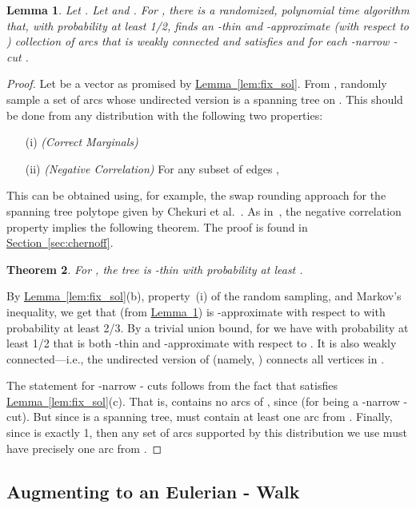 \documentclass[11pt]{article}
\newcommand{\lref}[2][]{\hyperref[#2]{#1~\ref*{#2}}}
\newtheorem{theorem}{Theorem}[section]
\newtheorem{lemma}[theorem]{Lemma}
\theoremstyle{definition}
\begin{document}
\begin{lemma} \label{lem:findtree}
  Let . Let  and .
For , there is a randomized,
  polynomial time algorithm that, with probability at least 1/2, finds
  an -thin and -approximate (with respect to )
  collection of arcs  that is weakly connected and satisfies  and  for each
  -narrow - cut .
\end{lemma}
\begin{proof}
  Let  be a vector as promised by \lref[Lemma]{lem:fix_sol}. From
  , randomly sample a set of arcs  whose undirected
  version  is a spanning tree on . This should be done
  from any distribution with the following two properties:
  \begin{itemize}
  \item[(i)] \emph{(Correct Marginals)} 
  \item[(ii)] \emph{(Negative Correlation)} For any subset of edges , 
  \end{itemize}
  This can be obtained using, for example, the swap rounding approach
  for the spanning tree polytope given by Chekuri et al.~\cite{CVZ10}.
  As in~\cite{AGMSS}, the negative correlation property implies the following
  theorem. The proof is found in \lref[Section]{sec:chernoff}.
  \begin{theorem}\label{thm:chernoff}
  For , the tree  is -thin with probability at least .
  \end{theorem}

  By \lref[Lemma]{lem:fix_sol}(b), property~(i) of the random sampling,
  and Markov's inequality, we get that  (from \lref[Lemma]{lem:findtree}) is
  -approximate with respect to  with probability
  at least 2/3. By a trivial union bound, for  we have
  with probability at least 1/2 that  is both -thin and -approximate with
  respect to . It is also weakly connected---i.e., the undirected
  version of  (namely, ) connects all vertices in .

  The statement for -narrow - cuts follows from the fact
  that  satisfies \lref[Lemma]{lem:fix_sol}(c). That is,  contains
  no arcs of , since  (for  being a
  -narrow - cut). But since  is a spanning tree,
   must contain at least one arc from . Finally, since
   is exactly 1, then any set of arcs supported by this
  distribution we use must have precisely one arc from .
\end{proof}

\subsection{Augmenting to an Eulerian - Walk}
\end{document}
